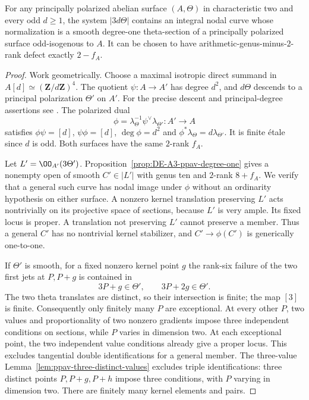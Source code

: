 \begin{lemma}
\label{lem:DE-A3-ppav-odd-norm}
For any principally polarized abelian surface $(A,\Theta)$ in
characteristic two and every odd $d\ge1$, the system $|3d\Theta|$
contains an integral nodal curve whose normalization is a smooth
degree-one theta-section of a principally polarized surface odd-isogenous
to $A$.  It can be chosen to have arithmetic-genus-minus-$2$-rank
defect exactly $2-f_A$.
\end{lemma}
\begin{proof}
Work geometrically.  Choose a maximal isotropic direct summand
in $A[d]\simeq(\mathbf Z/d\mathbf Z)^4$.  The quotient
$\psi:A\to A'$ has degree $d^2$, and $d\Theta$ descends to a
principal polarization $\Theta'$ on $A'$.
For the precise descent and principal-degree assertions see
\cite[Corollary~8.11, p.~117, and Proposition~8.19,
p.~119]{EdixhovenVanDerGeerMoonenAV}.
The polarized dual
\[
 \phi=\lambda_\Theta^{-1}\psi^\vee\lambda_{\Theta'}:A'\to A
\]
satisfies $\phi\psi=[d]$, $\psi\phi=[d]$,
$\deg\phi=d^2$ and $\phi^*\lambda_\Theta=d\lambda_{\Theta'}$.
It is finite \'etale since $d$ is odd.  Both surfaces have the
same $2$-rank $f_A$.

Let $L'=\OO_{A'}(3\Theta')$.  Proposition~\ref{prop:DE-A3-ppav-degree-one}
gives a nonempty open of smooth $C'\in|L'|$ with genus ten and
$2$-rank $8+f_A$.  We verify that a general such curve has nodal image
under $\phi$ without an ordinarity hypothesis on either surface.
A nonzero kernel translation preserving $L'$ acts nontrivially on
its projective space of sections, because $L'$ is very ample.
Its fixed locus is proper.  A translation not preserving $L'$ cannot
preserve a member.  Thus a general $C'$ has no nontrivial kernel
stabilizer, and $C'\to\phi(C')$ is generically one-to-one.

If $\Theta'$ is smooth, for a fixed nonzero kernel point $g$ the
rank-six failure of the two first jets at $P,P+g$ is contained in
\[
                   3P+g\in\Theta',\qquad
                   3P+2g\in\Theta'.
\]
The two theta translates are distinct, so their intersection is finite;
the map $[3]$ is finite.  Consequently only finitely many $P$ are
exceptional.  At every other $P$, two values and proportionality of
two nonzero gradients impose three independent conditions on sections,
while $P$ varies in dimension two.  At each exceptional point, the two
independent value conditions already give a proper locus.  This excludes
tangential double identifications for a general member.  The three-value
Lemma~\ref{lem:ppav-three-distinct-values} excludes triple
identifications: three distinct points $P,P+g,P+h$ impose three
conditions, with $P$ varying in dimension two.  There are finitely
many kernel elements and pairs.


\end{proof}
